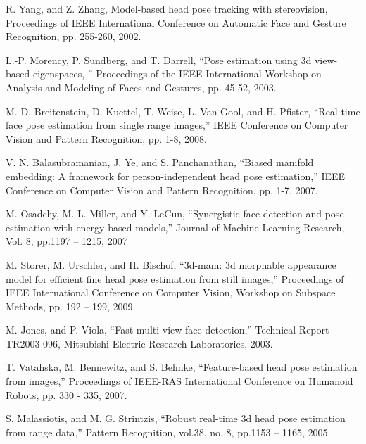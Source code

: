 \begin{thebibliography}{}
%
%



R. Yang, and Z. Zhang, Model-based head pose tracking with stereovision, Proceedings of IEEE International Conference on Automatic Face and Gesture Recognition, pp. 255-260, 2002.

L.-P. Morency, P. Sundberg, and T. Darrell, “Pose estimation using 3d view-based eigenspaces, ” Proceedings of the IEEE International Workshop on Analysis and Modeling of Faces and Gestures, pp. 45-52, 2003.

M. D. Breitenstein, D. Kuettel, T. Weise, L. Van Gool, and H. Pfister, “Real-time face pose estimation from single range images,” IEEE Conference on Computer Vision and Pattern Recognition, pp. 1-8, 2008.

V. N. Balasubramanian, J. Ye, and S. Panchanathan, “Biased manifold embedding: A framework for person-independent head pose estimation,” IEEE Conference on Computer Vision and Pattern Recognition, pp. 1-7,  2007.

M. Osadchy, M. L. Miller, and Y. LeCun, “Synergistic face detection and pose estimation with energy-based models,” Journal of Machine Learning Research, Vol. 8, pp.1197 – 1215, 2007

M. Storer, M. Urschler, and H. Bischof, “3d-mam: 3d morphable appearance model for efficient fine head pose estimation from still images,” Proceedings of IEEE International Conference on Computer Vision, Workshop on Subspace Methods, pp. 192 – 199, 2009.

M. Jones, and P. Viola, “Fast multi-view face detection,” Technical Report TR2003-096, Mitsubishi Electric Research Laboratories, 2003.

T. Vatahska, M. Bennewitz, and S. Behnke, “Feature-based head pose estimation from images,” Proceedings of IEEE-RAS International Conference on Humanoid Robots, pp. 330 - 335, 2007.

S. Malassiotis, and M. G. Strintzis, “Robust real-time 3d head pose estimation from range data,” Pattern Recognition, vol.38, no. 8, pp.1153 – 1165, 2005.


\end{thebibliography}
